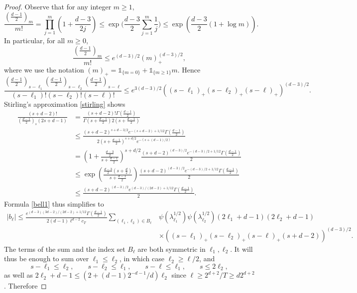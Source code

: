 \documentclass[11pt,a4paper]{article}
\theoremstyle{definition}
\begin{document}
\begin{proof}
Observe that for any integer $m \ge 1$,
\[ \frac{\left( \frac{d-1}{2} \right)_m}{m!} = \prod_{j=1}^m \left( 1+\frac{d-3}{2j} \right) \le \exp \Bigg( \frac{d-3}{2} \sum_{j=1}^m \frac{1}{j} \Bigg) \le \exp \left( \frac{d-3}{2} (1+\log m) \right) . \]
In particular, for all $m \ge 0$,
\[ \frac{\left( \frac{d-1}{2} \right)_m}{m!} \le e^{(d-3)/2} (m)_+^{(d-3)/2}, \]
where we use the notation $(m)_+=\mathds{1}_{\{ m=0 \}} + \mathds{1}_{\{ m \ge 1 \}} m$. Hence
\[ \frac{\left( \frac{d-1}{2} \right)_{s-\ell_1} \left( \frac{d-1}{2} \right)_{s-\ell_2} \left( \frac{d-1}{2} \right)_{s-\ell}}{(s-\ell_1)!(s-\ell_2)!(s-\ell)!} \le e^{3(d-3)/2} \left( (s-\ell_1)_+ (s-\ell_2)_+ (s-\ell)_+ \right)^{(d-3)/2} . \]
Stirling's approximation \eqref{stirling} shows
\[ \begin{split} \frac{(s+d-2)!}{\left( \frac{d-1}{2} \right)_s (2s+d-1)} &= \frac{(s+d-2)! \Gamma \left( \frac{d-1}{2} \right)}{\Gamma \left( s+ \frac{d-1}{2} \right) 2 \left( s+\frac{d-1}{2} \right)} \\ &\le \frac{(s+d-2)^{s+d-3/2} e^{-(s+d-2)+1/12} \Gamma \left( \frac{d-1}{2} \right)}{2 \left( s+\frac{d-1}{2} \right)^{s+d/2} e^{-(s+(d-1)/2)}} \\ &= \left( 1+\frac{\frac{d-3}{2}}{s+\frac{d-1}{2}} \right)^{s+d/2} \frac{(s+d-2)^{(d-3)/2} e^{-(d-3)/2+1/12} \Gamma \left( \frac{d-1}{2} \right)}{2} \\ &\le \exp \left( \frac{\frac{d-3}{2} \left( s+\frac{d}{2} \right)}{s+\frac{d-1}{2}} \right) \frac{(s+d-2)^{(d-3)/2} e^{-(d-3)/2+1/12} \Gamma \left( \frac{d-1}{2} \right)}{2} \\ &\le \frac{(s+d-2)^{(d-3)/2} e^{(d-3)/(2d-2)+1/12} \Gamma \left( \frac{d-1}{2} \right)}{2} . \end{split} \]
Formula \eqref{bell1} thus simplifies to
\[ \begin{split} |b_{\ell}| \le \frac{e^{(d-3)(3d-2)/(2d-2)+1/12} \Gamma \left( \frac{d-1}{2} \right)}{2(d-1) \ell^{d-2} c_T} \sum_{(\ell_1, \ell_2) \in B_{\ell}} &\psi (\lambda_{\ell_1}^{1/2}) \psi (\lambda_{\ell_2}^{1/2}) (2\ell_1 +d-1)(2\ell_2 +d-1) \\ &\times \left( (s-\ell_1)_+ (s-\ell_2)_+ (s-\ell)_+ (s+d-2) \right)^{(d-3)/2} . \end{split} \]
The terms of the sum and the index set $B_{\ell}$ are both symmetric in $\ell_1, \ell_2$. It will thus be enough to sum over $\ell_1 \le \ell_2$, in which case $\ell_2 \ge \ell/2$, and
\[ s-\ell_1 \le \ell_2, \qquad s-\ell_2 \le \ell_1 , \qquad s-\ell \le \ell_1, \qquad s \le 2 \ell_2, \]
as well as $2 \ell_2 +d-1 \le (2+(d-1)2^{-d-1}/d)\ell_2$ since $\ell \ge 2^{d+2}/T \ge d2^{d+2}$. Therefore

\end{proof}
\end{document}
